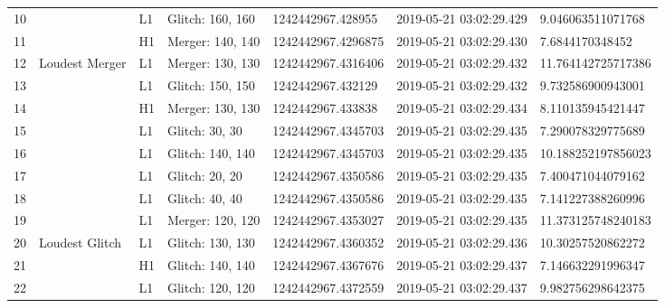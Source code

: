 \begin{longtable}{lllllll}
10   &                                                    &       L1 &  Glitch: 160, 160 &   1242442967.428955 &  2019-05-21 03:02:29.429 &   9.046063511071768 \\
11   &                                                    &       H1 &  Merger: 140, 140 &  1242442967.4296875 &  2019-05-21 03:02:29.430 &     7.6844170348452 \\
12   &                                     Loudest Merger &       L1 &  Merger: 130, 130 &  1242442967.4316406 &  2019-05-21 03:02:29.432 &  11.764142725717386 \\
13   &                                                    &       L1 &  Glitch: 150, 150 &   1242442967.432129 &  2019-05-21 03:02:29.432 &   9.732586900943001 \\
14   &                                                    &       H1 &  Merger: 130, 130 &   1242442967.433838 &  2019-05-21 03:02:29.434 &   8.110135945421447 \\
15   &                                                    &       L1 &    Glitch: 30, 30 &  1242442967.4345703 &  2019-05-21 03:02:29.435 &   7.290078329775689 \\
16   &                                                    &       L1 &  Glitch: 140, 140 &  1242442967.4345703 &  2019-05-21 03:02:29.435 &  10.188252197856023 \\
17   &                                                    &       L1 &    Glitch: 20, 20 &  1242442967.4350586 &  2019-05-21 03:02:29.435 &   7.400471044079162 \\
18   &                                                    &       L1 &    Glitch: 40, 40 &  1242442967.4350586 &  2019-05-21 03:02:29.435 &   7.141227388260996 \\
19   &                                                    &       L1 &  Merger: 120, 120 &  1242442967.4353027 &  2019-05-21 03:02:29.435 &  11.373125748240183 \\
20   &                                     Loudest Glitch &       L1 &  Glitch: 130, 130 &  1242442967.4360352 &  2019-05-21 03:02:29.436 &   10.30257520862272 \\
21   &                                                    &       H1 &  Glitch: 140, 140 &  1242442967.4367676 &  2019-05-21 03:02:29.437 &   7.146632291996347 \\
22   &                                                    &       L1 &  Glitch: 120, 120 &  1242442967.4372559 &  2019-05-21 03:02:29.437 &   9.982756298642375 \\

\end{longtable}
